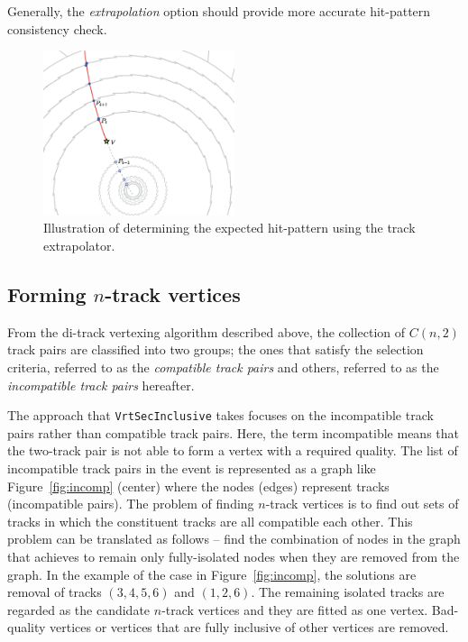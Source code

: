 \documentclass[NOTE, atlasdraft=true, texlive=2018, UKenglish]{\ATLASLATEXPATH atlasdoc}
\begin{document}
Generally, the \emph{extrapolation} option should provide more accurate hit-pattern consistency check.

\begin{figure}[t]
\begin{center}
\includegraphics[width=0.5\textwidth]{figures/extrapolation}
\caption{Illustration of determining the expected hit-pattern using the track extrapolator.}
\label{fig:extrapolation}
\end{center}
\end{figure}



\subsection{Forming $n$-track vertices}
From the di-track vertexing algorithm described above, the collection of $C(n,2)$ track pairs are classified into two groups; the ones that satisfy the selection criteria, referred to as the \emph{compatible track pairs} and others, referred to as the \emph{incompatible track pairs} hereafter.

The approach that {\tt VrtSecInclusive} takes focuses on the incompatible track pairs rather than compatible track pairs. Here, the term incompatible means that the two-track pair is not able to form a vertex with a required quality. The list of incompatible track pairs in the event is represented as a graph like Figure~\ref{fig:incomp} (center) where the nodes (edges) represent tracks (incompatible pairs). The problem of finding $n$-track vertices is to find out sets of tracks in which the constituent tracks are all compatible each other. This problem can be translated as follows -- find the combination of nodes in the graph that achieves to remain only fully-isolated nodes when they are removed from the graph. In the example of the case in Figure~\ref{fig:incomp}, the solutions are removal of tracks $(3,4,5,6)$ and $(1,2,6)$. The remaining isolated tracks are regarded as the candidate $n$-track vertices and they are fitted as one vertex. Bad-quality vertices or vertices that are fully inclusive of other vertices are removed.
\end{document}
